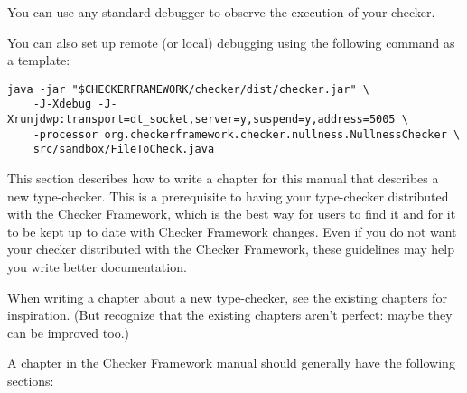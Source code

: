 
You can use any standard debugger to observe the execution of your checker.

You can also set up remote (or local) debugging using the following command as a template:

\begin{Verbatim}
java -jar "$CHECKERFRAMEWORK/checker/dist/checker.jar" \
    -J-Xdebug -J-Xrunjdwp:transport=dt_socket,server=y,suspend=y,address=5005 \
    -processor org.checkerframework.checker.nullness.NullnessChecker \
    src/sandbox/FileToCheck.java

\end{Verbatim}



This section describes how to write a chapter for this manual that
describes a new type-checker.  This is a prerequisite to having your
type-checker distributed with the Checker Framework, which is the best way
for users to find it and for it to be kept up to date with Checker
Framework changes.  Even if you do not want your checker distributed with
the Checker Framework, these guidelines may help you write better
documentation.

When writing a chapter about a new type-checker, see the existing chapters
for inspiration.  (But recognize that the existing chapters aren't perfect:
maybe they can be improved too.)

A chapter in the Checker Framework manual should generally have the
following sections:


